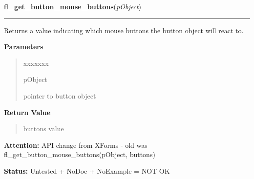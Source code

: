 \hspace{.8\funcindent}\begin{boxedminipage}{\funcwidth}

    \raggedright \textbf{fl\_get\_button\_mouse\_buttons}(\textit{pObject})

    \vspace{-1.5ex}

    \rule{\textwidth}{0.5\fboxrule}
\setlength{\parskip}{2ex}
    Returns a value indicating which mouse buttons the button object will 
    react to.

\setlength{\parskip}{1ex}
      \textbf{Parameters}
      \vspace{-1ex}

      \begin{quote}
        \begin{Ventry}{xxxxxxx}

          \item[pObject]

          pointer to button object

        \end{Ventry}

      \end{quote}

      \textbf{Return Value}
    \vspace{-1ex}

      \begin{quote}
      buttons value

      \end{quote}

\textbf{Attention:} API change from XForms - old was fl\_get\_button\_mouse\_buttons(pObject, 
buttons)



\textbf{Status:} Untested + NoDoc + NoExample = NOT OK



    \end{boxedminipage}

    \label{xformslib:library:fl_create_generic_canvas}

    \vspace{0.5ex}

